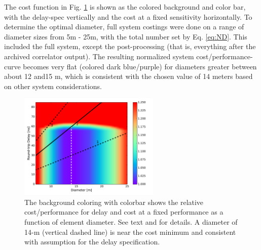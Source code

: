 \documentclass[preprint,11pt]{aastex}
\begin{document}
The cost function in Fig. \ref{fig:costfig} is shown as the colored background and color bar, with the delay-spec vertically and the cost at a fixed sensitivity horizontally. 
To determine the optimal diameter, full system costings were done on a range of diameter sizes from 5m - 25m, with the total number set by Eq. \ref{eq:ND}.  This included the full system, except the post-processing (that is, everything after the archived correlator output).  
The resulting normalized system cost/performance-curve  becomes very flat (colored dark blue/purple) for diameters greater between about 12 and15 m, which is consistent with the chosen value of 14 meters based on other system considerations.

\begin{figure}[t]
\centerline{
\includegraphics[width=0.6\textwidth]{plots/costfig.pdf} 
}
\caption{\small The background coloring with colorbar shows the relative cost/performance for delay and cost at a fixed performance as a function of element diameter.  See text and \cite{elementmemo} for details.  A diameter of 14-m (vertical dashed line) is near the cost minimum and consistent with assumption for the delay specification.
\label{fig:costfig}}
\end{figure}
\end{document}

